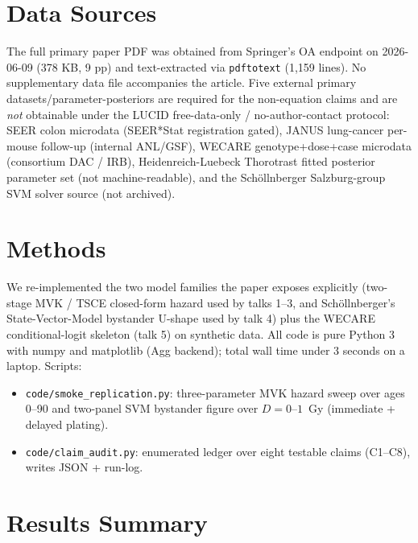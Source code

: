 \documentclass[11pt]{article}
\begin{document}
\section{Data Sources}

The full primary paper PDF was obtained from Springer's OA endpoint on
2026-06-09 (378 KB, 9 pp) and text-extracted via \texttt{pdftotext}
(1{,}159 lines). No supplementary data file accompanies the article.
Five external primary datasets/parameter-posteriors are required for the
non-equation claims and are \emph{not} obtainable under the LUCID
free-data-only / no-author-contact protocol:
SEER colon microdata (SEER*Stat registration gated),
JANUS lung-cancer per-mouse follow-up (internal ANL/GSF),
WECARE genotype+dose+case microdata (consortium DAC / IRB),
Heidenreich-Luebeck Thorotrast fitted posterior parameter set
(not machine-readable), and the Sch\"ollnberger Salzburg-group SVM
solver source (not archived).

\section{Methods}

We re-implemented the two model families the paper exposes explicitly
(two-stage MVK / TSCE closed-form hazard used by talks 1--3, and
Sch\"ollnberger's State-Vector-Model bystander U-shape used by talk 4)
plus the WECARE conditional-logit skeleton (talk 5) on synthetic data.
All code is pure Python 3 with numpy and matplotlib (Agg backend); total
wall time under 3 seconds on a laptop. Scripts:

\begin{itemize}
\item \texttt{code/smoke\_replication.py}: three-parameter MVK hazard sweep
      over ages 0--90 and two-panel SVM bystander figure over
      $D=0$--$1$~Gy (immediate + delayed plating).
\item \texttt{code/claim\_audit.py}: enumerated ledger over eight testable
      claims (C1--C8), writes JSON + run-log.
\end{itemize}

\section{Results Summary}
\end{document}
